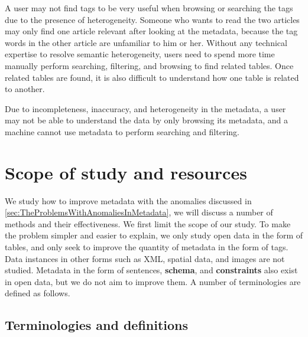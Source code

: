 A user may not find tags to be very useful when browsing or searching the tags due to the presence of heterogeneity. Someone who wants to read the two articles may only find one article relevant after looking at the metadata, because the tag words in the other article are unfamiliar to him or her. Without any technical expertise to resolve semantic heterogeneity, users need to spend more time manually perform searching, filtering, and browsing to find related tables. Once related tables are found, it is also difficult to understand how one table is related to another.

Due to incompleteness, inaccuracy, and heterogeneity in the metadata, a user may not be able to understand the data by only browsing its metadata, and a machine cannot use metadata to perform searching and filtering.

\section{Scope of study and resources}
\label{sec:ScopeOfStudyAndResources}

We study how to improve metadata with the anomalies discussed in \autoref{sec:TheProblemsWithAnomaliesInMetadata}, we will discuss a number of methods and their effectiveness. We first limit the scope of our study. To make the problem simpler and easier to explain, we only study open data in the form of tables, and only seek to improve the quantity of metadata in the form of tags. Data instances in other forms such as XML, spatial data, and images are not studied. Metadata in the form of sentences, \textbf{\gls{schema}}, and \textbf{\glspl{constraint}} also exist in open data, but we do not aim to improve them. A number of terminologies are defined as follows.

\subsection{Terminologies and definitions}

